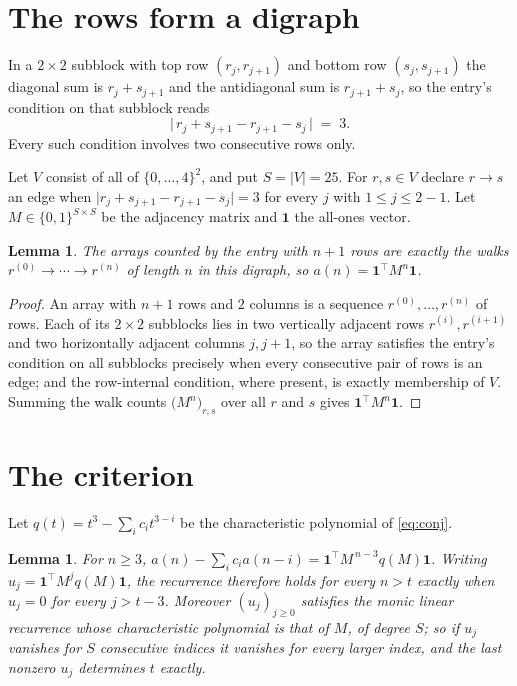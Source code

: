 \documentclass[11pt,a4paper]{article}
\theoremstyle{plain}
\newtheorem{lemma}[theorem]{Lemma}
\theoremstyle{definition}
\begin{document}
\section{The rows form a digraph}

In a $2\times2$ subblock with top row $(r_j,r_{j+1})$ and bottom row $(s_j,s_{j+1})$ the
diagonal sum is $r_j+s_{j+1}$ and the antidiagonal sum is $r_{j+1}+s_j$, so the entry's
condition on that subblock reads
\[
\bigl|\,r_j+s_{j+1}-r_{j+1}-s_j\,\bigr|\;=\;3.
\]
Every such condition involves two consecutive rows only.

Let $V$ consist of all of $\{0,\dots,4\}^{2}$, and put $S=|V|=25$. For $r,s\in V$ declare $r\to s$ an edge
when $\bigl|r_j+s_{j+1}-r_{j+1}-s_j\bigr|=3$ for every $j$ with
$1\le j\le2-1$. Let $M\in\{0,1\}^{S\times S}$ be the adjacency matrix and $\mathbf{1}$
the all-ones vector.

\begin{lemma}\label{lem:walk}
The arrays counted by the entry with $n+1$ rows are exactly the walks
$r^{(0)}\to\cdots\to r^{(n)}$ of length $n$ in this digraph, so
$a(n)=\mathbf{1}^{\!\top}M^{n}\mathbf{1}$.
\end{lemma}

\begin{proof}
An array with $n+1$ rows and $2$ columns is a sequence $r^{(0)},\dots,r^{(n)}$ of
rows. Each of its $2\times2$ subblocks lies in two vertically adjacent rows
$r^{(i)},r^{(i+1)}$ and two horizontally adjacent columns $j,j+1$, so the array satisfies
the entry's condition on all subblocks precisely when every consecutive pair of rows is an
edge; and the row-internal condition, where present, is exactly membership of $V$. Summing
the walk counts $\bigl(M^{n}\bigr)_{r,s}$ over all $r$ and $s$ gives
$\mathbf{1}^{\!\top}M^{n}\mathbf{1}$.
\end{proof}

\section{The criterion}

Let $q(t)=t^{3}-\sum_i c_i t^{3-i}$ be the characteristic polynomial of
\eqref{eq:conj}.

\begin{lemma}\label{lem:crit}
For $n\ge3$,
$a(n)-\sum_i c_i a(n-i)=\mathbf{1}^{\!\top}M^{\,n-3}q(M)\mathbf{1}$. Writing
$u_j=\mathbf{1}^{\!\top}M^{j}q(M)\mathbf{1}$, the recurrence therefore holds for every
$n>t$ exactly when $u_j=0$ for every $j>t-3$. Moreover $(u_j)_{j\ge0}$ satisfies the
monic linear recurrence whose characteristic polynomial is that of $M$, of degree $S$; so
if $u_j$ vanishes for $S$ consecutive indices it vanishes for every larger index, and the
last nonzero $u_j$ determines $t$ exactly.
\end{lemma}
\end{document}
